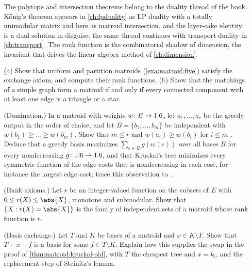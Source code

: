\begin{refsection}
The polytope and intersection theorems belong to the duality thread of the book. K\H{o}nig's theorem appears in \cref{ch:lpduality} as LP duality with a totally unimodular matrix and here as matroid intersection, and the layer-cake identity is a dual solution in disguise; the same thread continues with transport duality in \cref{ch:transport}. The rank function is the combinatorial shadow of dimension, the invariant that drives the linear-algebra method of \cref{ch:dimension}.

\begin{exercises}
\item \consolidation\label{ex:matroid:uniform} (a) Show that uniform and partition matroids (\cref{exa:matroid:five}) satisfy the exchange axiom, and compute their rank functions. (b) Show that the matchings of a simple graph form a matroid if and only if every connected component with at least one edge is a triangle or a star.

\item \consolidation\label{ex:matroid:gale} (Domination.) In a matroid with weights $w\colon E\to1.6$, let $a_1,\dots,a_r$ be the greedy output in the order of choice, and let $B=\{b_1,\dots,b_m\}$ be independent with $w(b_1)\ge\dots\ge w(b_m)$. Show that $m\le r$ and $w(a_i)\ge w(b_i)$ for $i\le m$ \parencite{Gale1968}. Deduce that a greedy basis maximizes $\sum_{e\in B}g(w(e))$ over all bases $B$ for every nondecreasing $g\colon1.6\to1.6$, and that Kruskal's tree minimizes every symmetric function of the edge costs that is nondecreasing in each cost, for instance the largest edge cost; \textcite{GrahamHell1985} trace this observation to \textcite{Prim1957}. 

\item \consolidation\hard\label{ex:matroid:rank-axioms} (Rank axioms.) Let $r$ be an integer-valued function on the subsets of $E$ with $0\le r(X)\le\abs{X}$, monotone and submodular. Show that $\{X : r(X)=\abs{X}\}$ is the family of independent sets of a matroid whose rank function is $r$. 

\item \consolidation\label{ex:matroid:basis-exchange} (Basis exchange.) Let $T$ and $K$ be bases of a matroid and $x\in K\setminus T$. Show that $T+x-f$ is a basis for some $f\in T\setminus K$. Explain how this supplies the swap in the proof of \cref{thm:matroid:kruskal-old}, with $T$ the cheapest tree and $x=k_i$, and the replacement step of Steinitz's lemma. 


\end{exercises}
\end{refsection}
